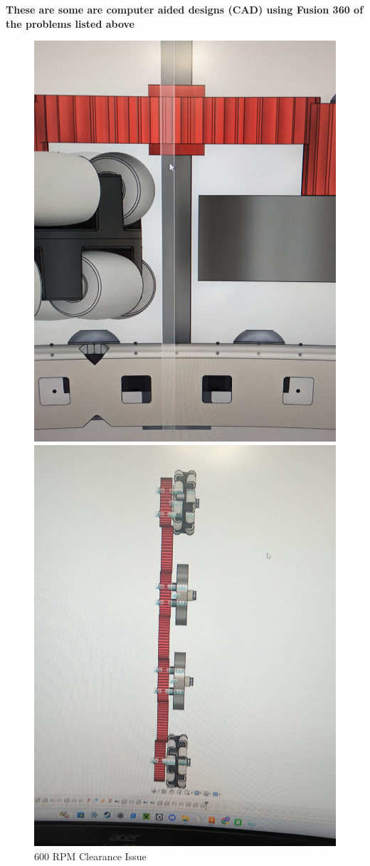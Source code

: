 \begin{center}
    \textbf{These are some are computer aided designs (CAD) using Fusion 360 of the problems listed above}
\end{center}
\begin{figure} [htb!]
    \begin{minipage}{.5\textwidth}
        \centering
        \includegraphics[width=.8\linewidth]{images/600 RPM Clearance Issue.jpg}
        \caption{600 RPM Clearance Issue}
        \label{fig:600-RPM-clearance-issue}
    \end{minipage}
    \begin{minipage}{.5\textwidth}
        \centering
        \includegraphics[width=.8\linewidth]{images/48t gears = too long.jpg}

\end{minipage}
\end{figure}
